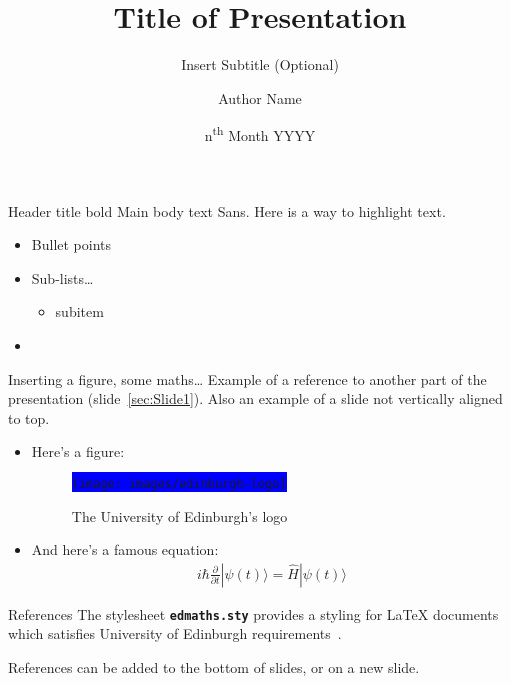 \documentclass[notes]{beamer}
\title[Insert Title (short version of title)]{Title of Presentation}
\subtitle{Insert Subtitle (Optional)}  %
\author{Author Name}
\date{n\textsuperscript{th} Month YYYY}
\begin{document}
\begin{frame}
    \titlepage{}
\end{frame}


\begin{frame}[t]{Header title bold}\label{sec:Slide1}
    Main body text Sans. Here is a way to \alert{highlight text}.
    \begin{itemize}
    \item Bullet points
    \item Sub-lists\ldots
        \begin{itemize}
            \item subitem
        \end{itemize}
    \item \lipsum[2]
    \end{itemize}
\end{frame}


\begin{frame}{Inserting a figure, some maths\ldots}
    Example of a reference to another part of the presentation (slide~\ref{sec:Slide1}). Also an example of a slide not vertically aligned to top.\newline

    \begin{itemize}
        \item Here's a figure:
            \begin{figure}[h]
                \centering
                \colorbox{blue}{\texttt{[image: images/edinburgh-logo]}}
                \caption{The University of Edinburgh's logo}\label{fig:edinburgh-logo}
            \end{figure}
        \item And here's a famous equation:
            \begin{eqnarray}
                \label{eq:schroedinger}
                i\hbar {\frac{\partial}{\partial t}}|\psi (t)\rangle ={\hat{H}}|\psi (t)\rangle
            \end{eqnarray}
    \end{itemize}
\end{frame}


\begin{frame}[t]{References}
    The stylesheet {\bf\texttt{edmaths.sty}} provides a styling for LaTeX{} documents which satisfies University of Edinburgh requirements~\cite{koeppe2007}. \newline        

    \lipsum[4]\newline

    References can be added to the bottom of slides, or on a new slide.
    \vfill 
    
    
\end{frame}
\end{document}
